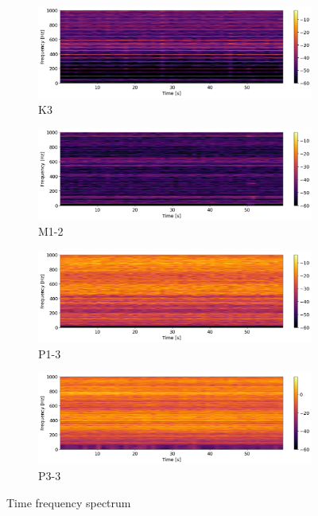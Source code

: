 \begin{figure}[h]
    \centering
    \begin{subfigure}[b]{0.48\textwidth}
        \includegraphics[width=\textwidth]{assets/results/time-frequency-spectrum/K3-z-STFT-1kHz.png}
        \caption{K3}
    \end{subfigure}
    \hfill
    \begin{subfigure}[b]{0.48\textwidth}
        \includegraphics[width=\textwidth]{assets/results/time-frequency-spectrum/M1-2-z-STFT-1kHz.png}
        \caption{M1-2}
    \end{subfigure}
    \hfill
    \begin{subfigure}[b]{0.48\textwidth}
        \includegraphics[width=\textwidth]{assets/results/time-frequency-spectrum/P1-3-z-STFT-1kHz.png}
        \caption{P1-3}
    \end{subfigure}
	\hfill
	\begin{subfigure}[b]{0.48\textwidth}
        \includegraphics[width=\textwidth]{assets/results/time-frequency-spectrum/P3-3-z-STFT-1kHz.png}
        \caption{P3-3}
    \end{subfigure}
    \caption{Time frequency spectrum}
\end{figure}


